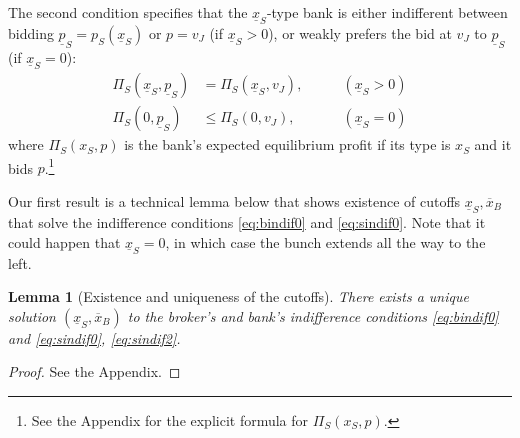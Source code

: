 \documentclass[11pt,twopage]{article}
\newcommand{\ol}{\overline}
\newcommand{\ul}{\underline}
\newtheorem{lemma}{Lemma}
{\bf}{\it}
\begin{document}
The second condition specifies that the $\underline x_S$-type bank is
either indifferent between bidding $\underline p_S = p_S(\ul x_S)$ or
$p=v_J$ (if $\underline x_S > 0$), or weakly prefers the bid at $v_J$
to $\underline p_S$ (if $\underline x_S = 0$):
\begin{align}
  \Pi_S(\underline x_S,\underline p_S) &= \Pi_S(\underline
  x_S,v_J),\quad\quad & (\underline x_S > 0)
  \label{eq:sindif0}
  \\
  \Pi_S(0,\underline p_S) &\leq \Pi_S (0, v_J), \quad\quad &
  (\underline x_S = 0) \label{eq:sindif2}
\end{align}
where $\Pi_S(x_S,p)$ is the bank's expected equilibrium profit if its
type is $x_S$ and it bids $p$.\footnote{See the Appendix for the
  explicit formula for $ \Pi_S(x_S,p)$.}

Our first result is a technical lemma below that shows existence of
cutoffs $\underline x_S, \ol x_B$ that solve the indifference
conditions \eqref{eq:bindif0} and \eqref{eq:sindif0}. Note that it
could happen that $\ul x_S = 0$, in which case the bunch extends all
the way to the left.
\begin{lemma}[Existence and uniqueness of the
  cutoffs]\label{lm:cutoffs}
  There exists a unique solution $(\underline x_S, \ol x_B)$ to the
  broker's and bank's indifference conditions \eqref{eq:bindif0} and
  \eqref{eq:sindif0}, \eqref{eq:sindif2}.
\end{lemma}
\begin{proof}See the Appendix.\end{proof}
\end{document}
